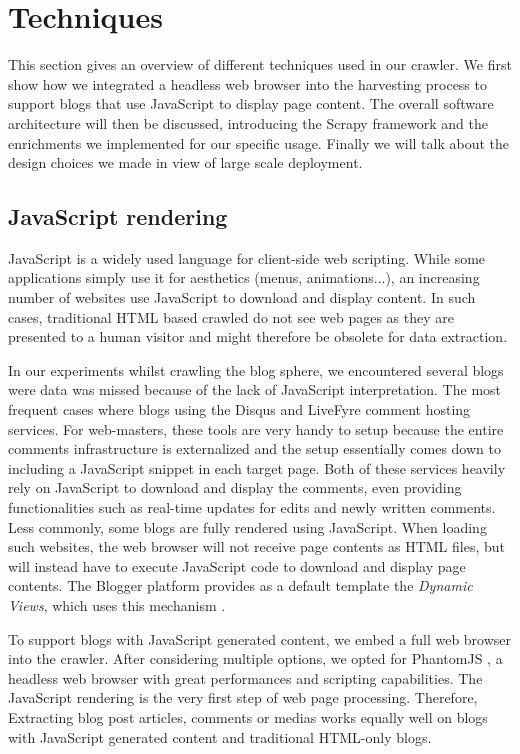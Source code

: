 \section{Techniques}

This section gives an overview of different techniques used in our crawler. We first show how we integrated a headless web browser into the harvesting process to support blogs that use JavaScript to display page content. The overall software architecture will then be discussed, introducing the Scrapy framework and the enrichments we implemented for our specific usage. Finally we will talk about the design choices we made in view of large scale deployment.


\subsection{JavaScript rendering}
JavaScript is a widely used language for client-side web scripting. While some applications simply use it for aesthetics (menus, animations...), an increasing number of websites use JavaScript to download and display content. In such cases, traditional HTML based crawled do not see web pages as they are presented to a human visitor and might therefore be obsolete for data extraction.

In our experiments whilst crawling the blog sphere, we encountered several blogs were data was missed because of the lack of JavaScript interpretation. The most frequent cases where blogs using the Disqus \cite{disqus2013} and LiveFyre \cite{livefyre2013} comment hosting services. For web-masters, these tools are very handy to setup because the entire comments infrastructure is externalized and the setup essentially comes down to including a JavaScript snippet in each target page. Both of these services heavily rely on JavaScript to download and display the comments, even providing functionalities such as real-time updates for edits and newly written comments. Less commonly, some blogs are fully rendered using JavaScript. When loading such websites, the web browser will not receive page contents as HTML files, but will instead have to execute JavaScript code to download and display page contents. The Blogger platform provides as a default template the \emph{Dynamic Views}, which uses this mechanism \cite{antinharasymiv2011}.

To support blogs with JavaScript generated content, we embed a full web browser into the crawler. After considering multiple options, we opted for PhantomJS \cite{phantomjs2013}, a headless web browser with great performances and scripting capabilities. The JavaScript rendering is the very first step of web page processing. Therefore, Extracting blog post articles, comments or medias works equally well on blogs with JavaScript generated content and traditional HTML-only blogs.

